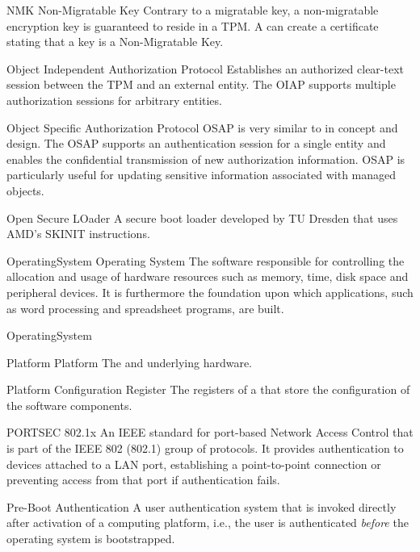 \glosentry
    {NMK}
    {Non-Migratable Key}
    {Contrary to a migratable key, a non-migratable encryption key is guaranteed
to reside in a TPM. A \TPM can create a certificate stating
that a key is a Non-Migratable Key.}

    {Object Independent Authorization Protocol}
    {Establishes an authorized clear-text session between the TPM and an external entity. 
The OIAP supports multiple authorization sessions for arbitrary entities.}

    {Object Specific Authorization Protocol}
    {OSAP is very similar to \OIAP in concept and design. The OSAP supports an authentication session for a single entity and enables the confidential transmission of new authorization information.  
OSAP is particularly useful for updating sensitive information associated with \TPM managed objects.}

    {Open Secure LOader}
    {A secure boot loader developed by TU Dresden that uses AMD's SKINIT
instructions.}

\glosentry
    {OperatingSystem}
    {Operating System}
    {The software responsible for controlling the allocation and usage of
hardware resources such as memory, \CPU time, disk space and peripheral devices.
It is furthermore the foundation upon which applications, such as word
processing and spreadsheet programs, are built.}

    {OperatingSystem}

\glosentry
    {Platform}
    {Platform}
    {The \TCB and underlying hardware.}

    {Platform Configuration Register}
    {The registers of a \TPM that store the configuration of the software
components.}

\glosentry
    {PORTSEC}
    {802.1x}
    {An IEEE standard for port-based Network Access Control that is part of
the IEEE 802 (802.1) group of protocols. It provides authentication to devices
attached to a LAN port, establishing a point-to-point connection or preventing
access from that port if authentication fails.}

    {Pre-Boot Authentication}
    {A user authentication system that is invoked directly after activation 
     of a computing platform, i.e., the user is authenticated \emph{before} 
     the operating system is bootstrapped.}


